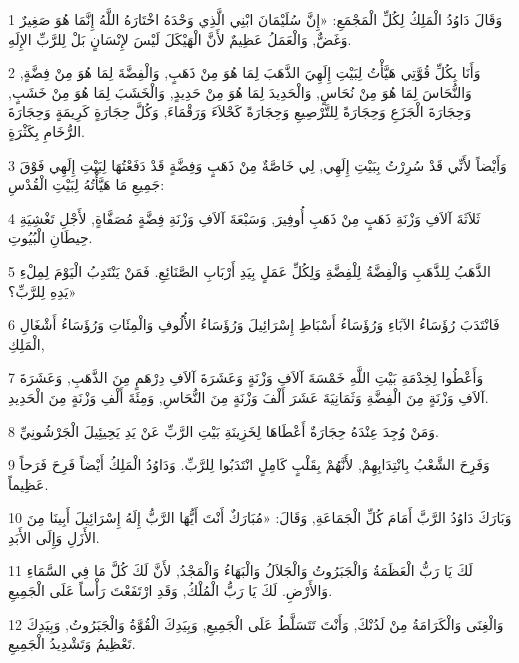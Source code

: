 \par 1 وَقَالَ دَاوُدُ الْمَلِكُ لِكُلِّ الْمَجْمَعِ: «إِنَّ سُلَيْمَانَ ابْنِي الَّذِي وَحْدَهُ اخْتَارَهُ اللَّهُ إِنَّمَا هُوَ صَغِيرٌ وَغَضٌّ, وَالْعَمَلُ عَظِيمٌ لأَنَّ الْهَيْكَلَ لَيْسَ لإِنْسَانٍ بَلْ لِلرَّبِّ الإِلَهِ.
\par 2 وَأَنَا بِكُلِّ قُوَّتِي هَيَّأْتُ لِبَيْتِ إِلَهِيَ الذَّهَبَ لِمَا هُوَ مِنْ ذَهَبٍ, وَالْفِضَّةَ لِمَا هُوَ مِنْ فِضَّةٍ, وَالنُّحَاسَ لِمَا هُوَ مِنْ نُحَاسٍ, وَالْحَدِيدَ لِمَا هُوَ مِنْ حَدِيدٍ, وَالْخَشَبَ لِمَا هُوَ مِنْ خَشَبٍ, وَحِجَارَةَ الْجَزَعِ وَحِجَارَةً لِلتَّرْصِيعِ وَحِجَارَةً كَحْلاَءَ وَرَقْمَاءَ, وَكُلَّ حِجَارَةٍ كَرِيمَةٍ وَحِجَارَةَ الرُّخَامِ بِكَثْرَةٍ.
\par 3 وَأَيْضاً لأَنِّي قَدْ سُرِرْتُ بِبَيْتِ إِلَهِي, لِي خَاصَّةٌ مِنْ ذَهَبٍ وَفِضَّةٍ قَدْ دَفَعْتُهَا لِبَيْتِ إِلَهِي فَوْقَ جَمِيعِ مَا هَيَّأْتُهُ لِبَيْتِ الْقُدْسِ:
\par 4 ثَلاَثَةَ آلاَفِ وَزْنَةِ ذَهَبٍ مِنْ ذَهَبِ أُوفِيرَ, وَسَبْعَةَ آلاَفِ وَزْنَةِ فِضَّةٍ مُصَفَّاةٍ, لأَجْلِ تَغْشِيَةِ حِيطَانِ الْبُيُوتِ.
\par 5 الذَّهَبُ لِلذَّهَبِ وَالْفِضَّةُ لِلْفِضَّةِ وَلِكُلِّ عَمَلٍ بِيَدِ أَرْبَابِ الصَّنَائِعِ. فَمَنْ يَنْتَدِبُ الْيَوْمَ لِمِلْءِ يَدِهِ لِلرَّبِّ؟»
\par 6 فَانْتَدَبَ رُؤَسَاءُ الآبَاءِ وَرُؤَسَاءُ أَسْبَاطِ إِسْرَائِيلَ وَرُؤَسَاءُ الأُلُوفِ وَالْمِئَاتِ وَرُؤَسَاءُ أَشْغَالِ الْمَلِكِ,
\par 7 وَأَعْطُوا لِخِدْمَةِ بَيْتِ اللَّهِ خَمْسَةَ آلاَفِ وَزْنَةٍ وَعَشَرَةَ آلاَفِ دِرْهَمٍ مِنَ الذَّهَبِ, وَعَشَرَةَ آلاَفِ وَزْنَةٍ مِنَ الْفِضَّةِ وَثَمَانِيَةَ عَشَرَ أَلْفَ وَزْنَةٍ مِنَ النُّحَاسِ, وَمِئَةَ أَلْفِ وَزْنَةٍ مِنَ الْحَدِيدِ.
\par 8 وَمَنْ وُجِدَ عِنْدَهُ حِجَارَةٌ أَعْطَاهَا لِخَزِينَةِ بَيْتِ الرَّبِّ عَنْ يَدِ يَحِيئِيلَ الْجَرْشُونِيِّ.
\par 9 وَفَرِحَ الشَّعْبُ بِانْتِدَابِهِمْ, لأَنَّهُمْ بِقَلْبٍ كَامِلٍ انْتَدَبُوا لِلرَّبِّ. وَدَاوُدُ الْمَلِكُ أَيْضاً فَرِحَ فَرَحاً عَظِيماً.
\par 10 وَبَارَكَ دَاوُدُ الرَّبَّ أَمَامَ كُلِّ الْجَمَاعَةِ, وَقَالَ: «مُبَارَكٌ أَنْتَ أَيُّهَا الرَّبُّ إِلَهُ إِسْرَائِيلَ أَبِينَا مِنَ الأَزَلِ وَإِلَى الأَبَدِ.
\par 11 لَكَ يَا رَبُّ الْعَظَمَةُ وَالْجَبَرُوتُ وَالْجَلاَلُ وَالْبَهَاءُ وَالْمَجْدُ, لأَنَّ لَكَ كُلَّ مَا فِي السَّمَاءِ وَالأَرْضِ. لَكَ يَا رَبُّ الْمُلْكُ, وَقَدِ ارْتَفَعْتَ رَأْساً عَلَى الْجَمِيعِ.
\par 12 وَالْغِنَى وَالْكَرَامَةُ مِنْ لَدُنْكَ, وَأَنْتَ تَتَسَلَّطُ عَلَى الْجَمِيعِ, وَبِيَدِكَ الْقُوَّةُ وَالْجَبَرُوتُ, وَبِيَدِكَ تَعْظِيمُ وَتَشْدِيدُ الْجَمِيعِ.
